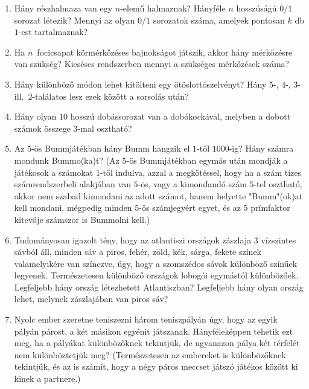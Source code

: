 \documentclass[a4paper,12pt]{article}
\begin{document}
\begin{enumerate}
        \item
        Hány részhalmaza van egy $n$-elemű halmaznak? Hányféle $n$ hosszúságú $0/1$
        sorozat létezik? Mennyi az olyan $0/1$ sorozatok száma, amelyek pontosan $k$
        db $1$-est tartalmaznak?

        \item
        Ha $n$\ focicsapat körmérkőzéses bajnokságot játszik, akkor hány mérkőzésre
        van szükség? Kieséses rendszerben mennyi a szükséges mérkőzések száma?

        \item
        Hány különböző módon lehet kitölteni egy ötöslottószelvényt? Hány
        $5$-, $4$-, $3$- ill.\ $2$-találatos lesz ezek között a sorsolás után?

        \item
        Hány olyan $10$ hosszú dobássorozat van a dobókockával, melyben a dobott
        számok összege $3$-mal osztható?

        \item
        Az $5$-ös Bummjátékban hány Bumm hangzik el $1$-től $1000$-ig? Hány számra
        mondunk Bummo(ka)t? (Az $5$-ös Bummjátékban egymás után mondják a játékosok a
        számokat $1$-től indulva, azzal a megkötéssel, hogy ha a szám tízes
        számrendszerbeli alakjában van $5$-ös, vagy a kimondandó szám $5$-tel
        osztható, akkor nem szabad kimondani az adott számot, hanem helyette
        "Bumm"(ok)at kell mondani, mégpedig minden $5$-ös számjegyért egyet, és
        az $5$ prímfaktor kitevője számszor is Bummolni kell.)

        \item
        Tudományosan igazolt tény, hogy az atlantiszi országok zászlaja $3$
        vízszintes sávból áll, minden sáv a piros, fehér, zöld, kék, sárga, fekete
        színek valamelyikére van színezve, úgy, hogy a szomszédos sávok különböző
        színűek legyenek. Természetesen különböző országok lobogói egymástól
        különbözőek. Legfeljebb hány ország létezhetett Atlantiszban?  Legfeljebb
        hány olyan ország lehet, melynek zászlajában van piros sáv?

        \item
        Nyolc ember szeretne teniszezni három teniszpályán úgy, hogy az egyik
        pályán párost, a két másikon egyénit játszanak. Hányféleképpen tehetik ezt
        meg, ha a pályákat különbözőknek tekintjük, de ugyanazon pálya két
        térfelét nem különböztetjük meg? (Természetesen az embereket is
        különbözőknek tekintjük, és az is számít, hogy a négy páros meccset játszó
        játékos között ki kinek a partnere.)


\end{enumerate}
\end{document}
